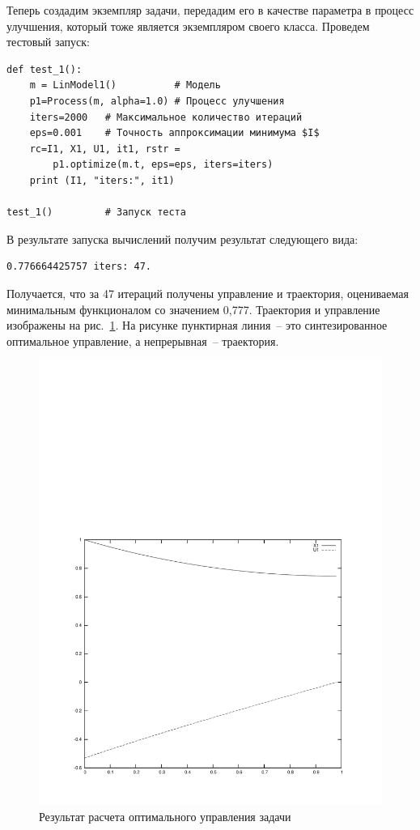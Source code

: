 \documentclass[a4paper,14pt, openany, twoside, final]{extbook} %
\begin{document}
Теперь создадим экземпляр задачи, передадим его в качестве параметра в процесс улучшения, который тоже является экземпляром своего класса.  Проведем тестовый запуск:

\begin{verbatim}
def test_1():
    m = LinModel1()          # Модель
    p1=Process(m, alpha=1.0) # Процесс улучшения
    iters=2000   # Максимальное количество итераций
    eps=0.001    # Точность аппроксимации минимума $I$
    rc=I1, X1, U1, it1, rstr =
        p1.optimize(m.t, eps=eps, iters=iters)
    print (I1, "iters:", it1)

test_1()         # Запуск теста
\end{verbatim}

В результате запуска вычислений получим результат следующего вида:
\begin{verbatim}
0.776664425757 iters: 47.
\end{verbatim}
Получается, что за 47 итераций получены управление и траектория, оцениваемая минимальным функционалом со значением 0,777.  Траектория и управление изображены на рис.~\ref{fig:result}. На рисунке пунктирная линия~-- это синтезированное оптимальное управление, а непрерывная~-- траектория.
\begin{figure}[hb]
  \centering
  \includegraphics[width=0.7\linewidth]{my-plot}
  \caption{Результат расчета оптимального управления задачи}
  \label{fig:result}
\end{figure}
\end{document}
